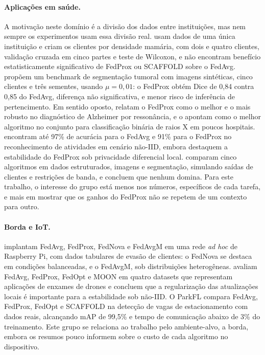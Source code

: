 \paragraph{Aplicações em saúde.}
A motivação neste domínio é a divisão dos dados entre instituições, mas nem sempre os experimentos usam essa divisão real. \citet{quintana2026mammography} usam dados de uma única instituição e criam os clientes por densidade mamária, com dois e quatro clientes, validação cruzada em cinco partes e teste de Wilcoxon, e não encontram benefício estatisticamente significativo de FedProx ou SCAFFOLD sobre o FedAvg. \citet{marella2025fedonco} propõem um benchmark de segmentação tumoral com imagens sintéticas, cinco clientes e três sementes, usando $\mu = 0{,}01$: o FedProx obtém Dice de 0,84 contra 0,85 do FedAvg, diferença não significativa, e menor risco de inferência de pertencimento. Em sentido oposto, \citet{mahmood2025alzheimer} relatam o FedProx como o melhor e o mais robusto no diagnóstico de Alzheimer por ressonância, e \citet{delehouzee2024crosssilo} o apontam como o melhor algoritmo no conjunto para classificação binária de raios X em poucos hospitais. \citet{vajjhula2025har} encontram até 97\% de acurácia para o FedAvg e 91\% para o FedProx no reconhecimento de atividades em cenário não-IID, embora destaquem a estabilidade do FedProx sob privacidade diferencial local. \citet{mim2025healthcare} comparam cinco algoritmos em dados estruturados, imagens e segmentação, simulando saídas de clientes e restrições de banda, e concluem que nenhum domina. Para este trabalho, o interesse do grupo está menos nos números, específicos de cada tarefa, e mais em mostrar que os ganhos do FedProx não se repetem de um contexto para outro.

\paragraph{Borda e IoT.}
\citet{carranco2025adhoc} implantam FedAvg, FedProx, FedNova e FedAvgM em uma rede \textit{ad hoc} de Raspberry Pi, com dados tabulares de evasão de clientes: o FedNova se destaca em condições balanceadas, e o FedAvgM, sob distribuições heterogêneas. \citet{hu2025uav} avaliam FedAvg, FedProx, FedOpt e MOON em quatro datasets que representam aplicações de enxames de drones e concluem que a regularização das atualizações locais é importante para a estabilidade sob não-IID. O ParkFL \citep{bakr2026parkfl} compara FedAvg, FedProx, FedOpt e SCAFFOLD na detecção de vagas de estacionamento com dados reais, alcançando mAP de 99,5\% e tempo de comunicação abaixo de 3\% do treinamento. Este grupo se relaciona ao trabalho pelo ambiente-alvo, a borda, embora os resumos pouco informem sobre o custo de cada algoritmo no dispositivo.

